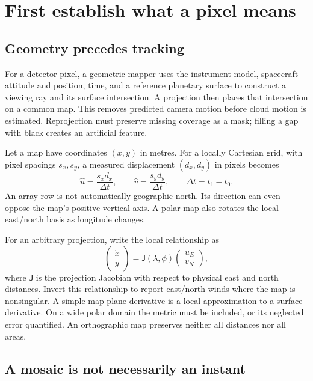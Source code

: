 \documentclass[11pt]{article}
\begin{document}
\section{First establish what a pixel means}

\subsection{Geometry precedes tracking}

For a detector pixel, a geometric mapper uses the instrument model,
spacecraft attitude and position, time, and a reference planetary surface to
construct a viewing ray and its surface intersection. A projection then
places that intersection on a common map. This removes predicted camera
motion before cloud motion is estimated. Reprojection must preserve missing
coverage as a mask; filling a gap with black creates an artificial feature.

Let a map have coordinates $(x,y)$ in metres. For a locally Cartesian grid,
with pixel spacings $s_x,s_y$, a measured displacement $(d_x,d_y)$ in pixels
becomes
\begin{equation}\label{eq:velocity}
 \widehat{u}=\frac{s_xd_x}{\Delta t},\qquad
 \widehat{v}=\frac{s_yd_y}{\Delta t},\qquad \Delta t=t_1-t_0.
\end{equation}
An array row is not automatically geographic north. Its direction can even
oppose the map's positive vertical axis. A polar map also rotates the local
east/north basis as longitude changes.

For an arbitrary projection, write the local relationship as
\begin{equation}
 \begin{pmatrix}\dot x\\\dot y\end{pmatrix}
 =\mathsf{J}(\lambda,\phi)
 \begin{pmatrix}u_E\\v_N\end{pmatrix},
\end{equation}
where $\mathsf{J}$ is the projection Jacobian with respect to physical east
and north distances. Invert this relationship to report east/north winds
where the map is nonsingular. A simple map-plane derivative is a local
approximation to a surface derivative. On a wide polar domain the metric
must be included, or its neglected error quantified. An orthographic map
preserves neither all distances nor all areas.

\subsection{A mosaic is not necessarily an instant}
\end{document}
